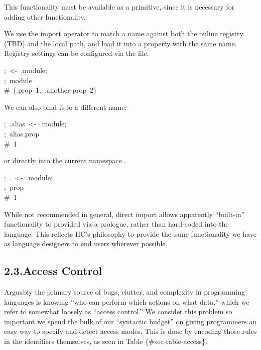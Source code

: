 \documentclass[preprint]{{acmart}}
\begin{document}
\noindent{}This functionality must be available as a primitive, since it is necessary
for adding other functionality.%

We use the \mdcode{\textless{}-} import operator to match a name against both the online
registry (TBD) and the local path, and load it into a property with the
same name. Registry settings can be configured via the  file.%
\begin{mdpre}%
\noindent;~\textless{}-~.{module};\\
;~{module}\\
{\#~(.prop~1,~.another-prop~2)}%
\end{mdpre}\noindent{}We can also bind it to a different name:
\begin{mdpre}%
\noindent;~.{alias}~\textless{}-~.{module};\\
;~{alias}.prop\\
{\#~1}%
\end{mdpre}\noindent{}or directly into the current namespace .
\begin{mdpre}%
\noindent;~.~\textless{}-~.{module};\\
;~prop\\
{\#~1}%
\end{mdpre}\noindent{}While not recommended in general, direct import allows apparently \textquotedblleft{}built-in\textquotedblright{}
functionality to provided via a prologue, rather than hard-coded into the
language.  This reflects HC's philosophy to provide the same functionality
we have as language designers to end users wherever possible.

\subsection{2.3.\hspace*{0.5em}Access Control}\label{sec-access}%

\noindent{}Arguably the primary source of bugs, clutter, and complexity in
programming languages is knowing \textquotedblleft{}who can perform which actions on what data,\textquotedblright{}
which we refer to somewhat loosely as \textquotedblleft{}access control.\textquotedblright{} We consider this
problem so important we spend the bulk of our \textquotedblleft{}syntactic budget\textquotedblright{} on
giving programmers an easy way to specify and detect access modes. This
is done by encoding those rules in the identifiers themselves, as seen in
Table \{\#sec-table-access\}.%
\end{document}

